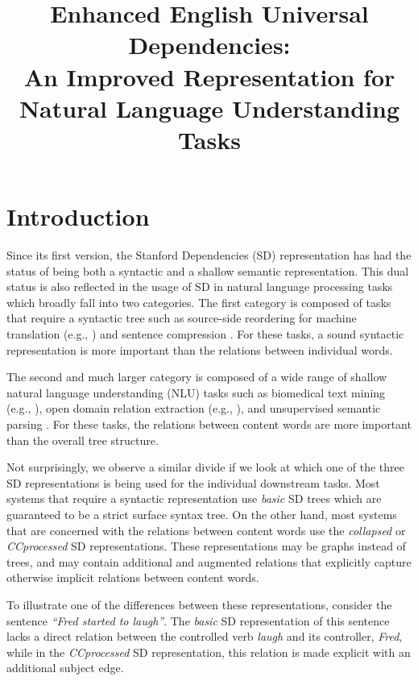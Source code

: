 \documentclass[10pt, a4paper]{article}
\title{Enhanced English Universal Dependencies:  \\ An Improved Representation for Natural Language Understanding Tasks}
\begin{document}
\maketitleabstract


\section{Introduction}

Since its first version, the Stanford Dependencies (SD) representation \cite{demarneffe2006generating}  
has had the status of being both a syntactic and a shallow semantic representation. 
This dual status is also reflected in the usage of SD in natural language processing tasks which broadly fall into
two categories. The first category is composed of tasks that require a syntactic tree such as source-side reordering 
for machine translation (e.g., ) and sentence compression \cite{galanis2010extractive}.
For these tasks, a sound syntactic representation is more important than the relations between individual words.  

The second and much larger category is composed of a wide range of shallow natural language understanding (NLU) tasks such as biomedical text mining 
(e.g., ), open domain relation extraction (e.g., ), and unsupervised semantic parsing
\cite{poon2009unsupervised}. For these tasks, the relations between content words are more important than the overall tree structure.

Not surprisingly, we observe a similar divide if we look at which 
one of the three SD representations %
is being used for the individual downstream tasks. 
Most systems that require a syntactic representation use 
\textit{basic} SD trees which are guaranteed to be a strict 
surface syntax tree. On the other hand, most systems that 
are concerned with the relations between content words use
 the \textit{collapsed} or \textit{CCprocessed} SD
representations. These representations may be graphs instead 
of trees, and may contain additional and augmented relations that 
explicitly capture otherwise implicit relations between content 
words. 

To illustrate one of the differences between these representations,
consider the sentence  \textit{``Fred started to laugh''}.
The \textit{basic} SD representation of 
this sentence lacks a direct relation between the 
controlled verb \textit{laugh} and its controller, \textit{Fred}, 
while in the \textit{CCprocessed} SD representation,
this relation is made explicit with an additional subject edge.
\end{document}
